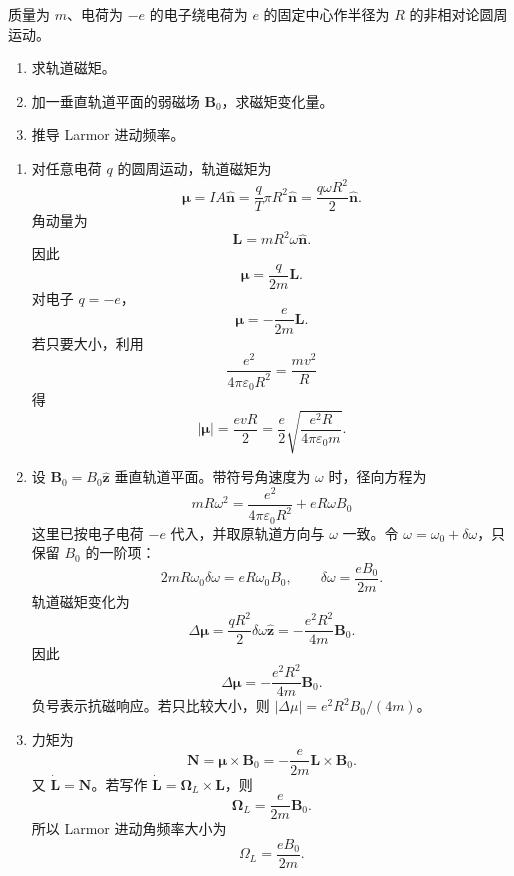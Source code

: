\begin{question}
质量为 $m$、电荷为 $-e$ 的电子绕电荷为 $e$ 的固定中心作半径为 $R$ 的非相对论圆周运动。
\begin{enumerate}
  \item 求轨道磁矩。
  \item 加一垂直轨道平面的弱磁场 $\mathbf B_0$，求磁矩变化量。
  \item 推导 Larmor 进动频率。
\end{enumerate}
\begin{solution}
\begin{enumerate}
  \item 对任意电荷 $q$ 的圆周运动，轨道磁矩为
  \[
    \boldsymbol\mu=IA\hat{\mathbf n}=\frac{q}{T}\pi R^2\hat{\mathbf n}
    =\frac{q\omega R^2}{2}\hat{\mathbf n} .
  \]
  角动量为
  \[
    \mathbf L=mR^2\omega\hat{\mathbf n} .
  \]
  因此
  \[
    \boxed{\boldsymbol\mu=\frac{q}{2m}\mathbf L} .
  \]
  对电子 $q=-e$，
  \[
    \boxed{\boldsymbol\mu=-\frac{e}{2m}\mathbf L} .
  \]
  若只要大小，利用
  \[
    \frac{e^2}{4\pi\varepsilon_0R^2}=\frac{mv^2}{R}
  \]
  得
  \[
    |\boldsymbol\mu|=\frac{evR}{2}
    =\frac e2\sqrt{\frac{e^2R}{4\pi\varepsilon_0m}} .
  \]

  \item 设 $\mathbf B_0=B_0\hat{\mathbf z}$ 垂直轨道平面。带符号角速度为 $\omega$ 时，径向方程为
  \[
    mR\omega^2=\frac{e^2}{4\pi\varepsilon_0R^2}+eR\omega B_0
  \]
  这里已按电子电荷 $-e$ 代入，并取原轨道方向与 $\omega$ 一致。令 $\omega=\omega_0+\delta\omega$，只保留 $B_0$ 的一阶项：
  \[
    2mR\omega_0\delta\omega=eR\omega_0B_0,
    \qquad
    \delta\omega=\frac{eB_0}{2m} .
  \]
  轨道磁矩变化为
  \[
    \Delta\boldsymbol\mu=\frac{qR^2}{2}\delta\omega\hat{\mathbf z}
    =-\frac{e^2R^2}{4m}\mathbf B_0 .
  \]
  因此
  \[
    \boxed{\Delta\boldsymbol\mu=-\frac{e^2R^2}{4m}\mathbf B_0} .
  \]
  负号表示抗磁响应。若只比较大小，则 $|\Delta\mu|=e^2R^2B_0/(4m)$。

  \item 力矩为
  \[
    \mathbf N=\boldsymbol\mu\times\mathbf B_0
    =-\frac{e}{2m}\mathbf L\times\mathbf B_0 .
  \]
  又 $\dot{\mathbf L}=\mathbf N$。若写作 $\dot{\mathbf L}=\boldsymbol\Omega_L\times\mathbf L$，则
  \[
    \boldsymbol\Omega_L=\frac{e}{2m}\mathbf B_0 .
  \]
  所以 Larmor 进动角频率大小为
  \[
    \boxed{\Omega_L=\frac{eB_0}{2m}} .
  \]
\end{enumerate}
\end{solution}
\end{question}

